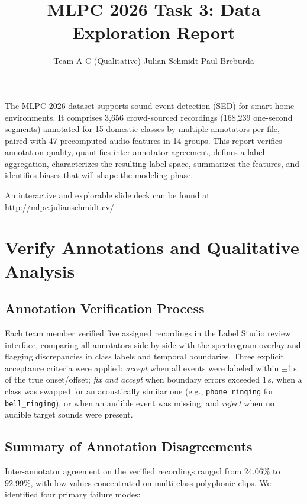 \documentclass{article}
\title{MLPC 2026 Task 3: Data Exploration Report}
\author{%
  Team A-C (Qualitative) \AND
  Julian Schmidt
  \And
  Paul Breburda
}
\begin{document}
\maketitle

The MLPC 2026 dataset supports sound event detection (SED) for smart home environments. It comprises 3{,}656 crowd-sourced recordings (168{,}239 one-second segments) annotated for 15 domestic classes by multiple annotators per file, paired with 47 precomputed audio features in 14 groups. This report verifies annotation quality, quantifies inter-annotator agreement, defines a label aggregation, characterizes the resulting label space, summarizes the features, and identifies biases that will shape the modeling phase. 

An interactive and explorable slide deck can be found at \url{http://mlpc.julianschmidt.cv/}

\section{Verify Annotations and Qualitative Analysis}

\subsection{Annotation Verification Process}

Each team member verified five assigned recordings in the Label Studio review interface, comparing all annotators side by side with the spectrogram overlay and flagging discrepancies in class labels and temporal boundaries. Three explicit acceptance criteria were applied: \emph{accept} when all events were labeled within $\pm$1\,s of the true onset/offset; \emph{fix and accept} when boundary errors exceeded 1\,s, when a class was swapped for an acoustically similar one (e.g., \texttt{phone\_ringing} for \texttt{bell\_ringing}), or when an audible event was missing; and \emph{reject} when no audible target sounds were present.

\subsection{Summary of Annotation Disagreements}

Inter-annotator agreement on the verified recordings ranged from 24.06\% to 92.99\%, with low values concentrated on multi-class polyphonic clips. We identified four primary failure modes:
\end{document}
